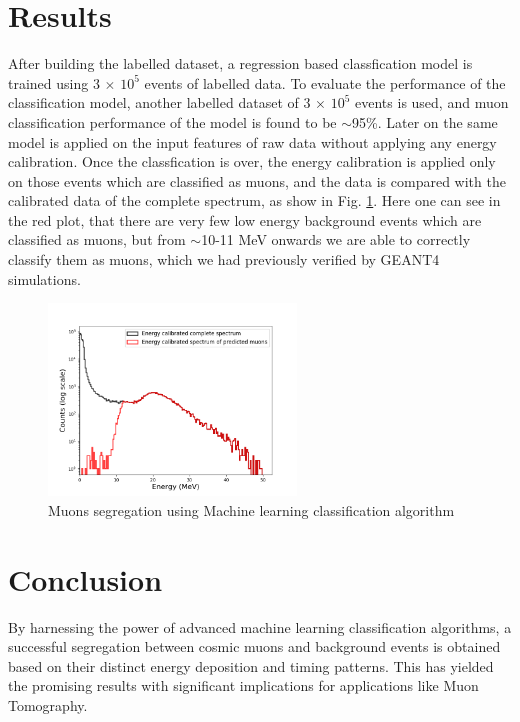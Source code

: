 \documentclass[twocolumn,amsmath,amssymb]{snp}
\begin{document}
\section*{Results}
 After building the labelled dataset, a regression based classfication model is trained using 3 $\times$ $10^{5}$ events of labelled data. To evaluate the performance of the classification model, another labelled dataset of 3 $\times$ $10^{5}$ events is used, and muon classification performance of the model is found to be $\sim$95\%. Later on the same model is applied on the input features of raw data  %
  without applying any energy calibration. Once the classfication is over, the energy calibration is applied only on those events which are classified as muons, and the data is compared with the calibrated data of the complete spectrum, as show in Fig. \ref{classfication}. Here one can see in the red plot, that there are very few low energy background events which are classified as muons, but from $\sim$10-11 MeV onwards we are able to correctly classify them as muons, which we had previously verified by GEANT4 simulations.

\begin{figure}
\includegraphics[width=66mm]{prediction2.png}%
\caption{\label{classfication} Muons segregation using Machine learning classification algorithm}
\end{figure}
\section*{Conclusion}
By harnessing the power of advanced machine learning classification algorithms, a successful segregation between cosmic muons and background events is obtained based on their distinct energy deposition and timing patterns. This has yielded the promising results with significant implications for applications like Muon Tomography. \\
\end{document}
